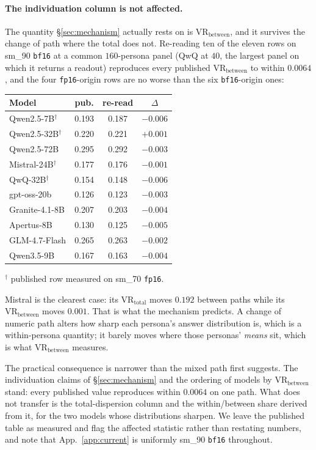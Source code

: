\documentclass[11pt]{article}
\begin{document}
\paragraph{The individuation column is not affected.} The quantity
\S\ref{sec:mechanism} actually rests on is $\mathrm{VR}_\text{between}$, and it
survives the change of path where the total does not. Re-reading ten of the
eleven rows on sm\_90 \texttt{bf16} at a common $160$-persona panel (QwQ at
$40$, the largest panel on which it returns a readout) reproduces every
published $\mathrm{VR}_\text{between}$ to within $0.0064$, and the four
\texttt{fp16}-origin rows are no worse than the six \texttt{bf16}-origin ones:

\begin{center}\scriptsize
\setlength{\tabcolsep}{2.5pt}
\begin{tabular}{lccc}
\toprule
Model & pub. & re-read & $\Delta$\\
\midrule
Qwen2.5-7B$^\dagger$ & 0.193 & 0.187 & $-0.006$\\
Qwen2.5-32B$^\dagger$ & 0.220 & 0.221 & $+0.001$\\
Qwen2.5-72B & 0.295 & 0.292 & $-0.003$\\
Mistral-24B$^\dagger$ & 0.177 & 0.176 & $-0.001$\\
QwQ-32B$^\dagger$ & 0.154 & 0.148 & $-0.006$\\
gpt-oss-20b & 0.126 & 0.123 & $-0.003$\\
Granite-4.1-8B & 0.207 & 0.203 & $-0.004$\\
Apertus-8B & 0.130 & 0.125 & $-0.005$\\
GLM-4.7-Flash & 0.265 & 0.263 & $-0.002$\\
Qwen3.5-9B & 0.167 & 0.163 & $-0.004$\\
\bottomrule
\end{tabular}
\end{center}

\noindent$^\dagger$ published row measured on sm\_70 \texttt{fp16}.

Mistral is the clearest case: its $\mathrm{VR}_\text{total}$ moves $0.192$
between paths while its $\mathrm{VR}_\text{between}$ moves $0.001$. That is what
the mechanism predicts. A change of numeric path alters how sharp each
persona's answer distribution is, which is a within-persona quantity; it barely
moves where those personas' \emph{means} sit, which is what
$\mathrm{VR}_\text{between}$ measures.

The practical consequence is narrower than the mixed path first suggests. The
individuation claims of \S\ref{sec:mechanism} and the ordering of models by
$\mathrm{VR}_\text{between}$ stand: every published value reproduces within
$0.0064$ on one path. What does not transfer is the total-dispersion column and
the within/between share derived from it, for the two models whose distributions
sharpen. We leave the published table as measured and flag the affected
statistic rather than restating numbers, and note that
App.~\ref{app:current} is uniformly sm\_90 \texttt{bf16} throughout.
\end{document}
